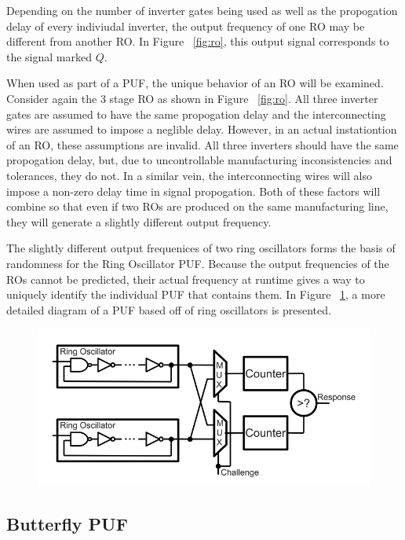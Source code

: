 Depending on the number of inverter gates being used
as well as the propogation delay of every indiviudal inverter, the output
frequency of one RO may be different from another RO. In Figure ~\ref{fig:ro},
this output signal corresponds to the signal marked $Q$.

When used as part of a PUF, the unique behavior of an RO will be examined.
Consider again the 3 stage RO as shown in Figure ~\ref{fig:ro}. All three
inverter gates are assumed to have the same propogation delay and the
interconnecting wires are assumed to impose a neglible delay. However, in
an actual instationtion of an RO, these assumptions are invalid. All three inverters
should have the same propogation delay, but, due to uncontrollable manufacturing
inconsistencies and tolerances, they do not. In a similar vein, the interconnecting
wires will also impose a non-zero delay time in signal propogation. Both of these
factors will combine so that even if two ROs are produced on the same 
manufacturing line, they will generate a slightly different output frequency.

The slightly different output frequenices of two ring oscillators forms the basis
of randomness for the Ring Oscillator PUF. Because the output frequencies of the
ROs cannot be predicted, their actual frequency at runtime gives a way to uniquely
identify the individual PUF that contains them. In Figure ~\ref{fig:ropuf}, a more
detailed diagram of a PUF based off of ring oscillators is presented.

\begin{figure}[h]
\includegraphics[width=500px]{images/ropuf.png}
\label{fig:ropuf}
\end{figure}

\subsection{Butterfly PUF}

